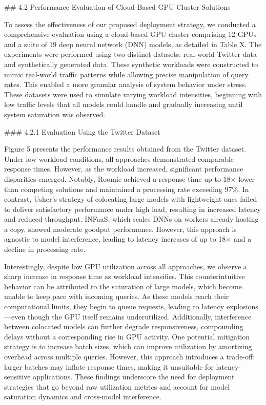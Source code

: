 ## 4.2 Performance Evaluation of Cloud-Based GPU Cluster Solutions

To assess the effectiveness of our proposed deployment strategy, we conducted a comprehensive evaluation using a cloud-based GPU cluster comprising 12 GPUs and a suite of 19 deep neural network (DNN) models, as detailed in Table X. The experiments were performed using two distinct datasets: real-world Twitter data and synthetically generated data.  These synthetic workloads were constructed to mimic real-world traffic patterns while allowing precise manipulation of query rates. This enabled a more granular analysis of system behavior under stress. These datasets were used to simulate varying workload intensities, beginning with low traffic levels that all models could handle and gradually increasing until system saturation was observed.

### 4.2.1 Evaluation Using the Twitter Dataset

Figure 5 presents the performance results obtained from the Twitter dataset. Under low workload conditions, all approaches demonstrated comparable response times. However, as the workload increased, significant performance disparities emerged. Notably, Roomie achieved a response time up to 18× lower than competing solutions and maintained a processing rate exceeding 97\%. In contrast, Usher’s strategy of colocating large models with lightweight ones failed to deliver satisfactory performance under high load, resulting in increased latency and reduced throughput. INFaaS, which scales DNNs on workers already hosting a copy, showed moderate goodput performance. However, this approach is agnostic to model interference, leading to latency increases of up to 18× and a decline in processing rate.

Interestingly, despite low GPU utilization across all approaches, we observe a sharp increase in response time as workload intensifies. This counterintuitive behavior can be attributed to the saturation of large models, which become unable to keep pace with incoming queries. As these models reach their computational limits, they begin to queue requests, leading to latency explosions—even though the GPU itself remains underutilized. Additionally, interference between colocated models can further degrade responsiveness, compounding delays without a corresponding rise in GPU activity. One potential mitigation strategy is to increase batch sizes, which can improve utilization by amortizing overhead across multiple queries. However, this approach introduces a trade-off: larger batches may inflate response times, making it unsuitable for latency-sensitive applications. These findings underscore the need for deployment strategies that go beyond raw utilization metrics and account for model saturation dynamics and cross-model interference.

